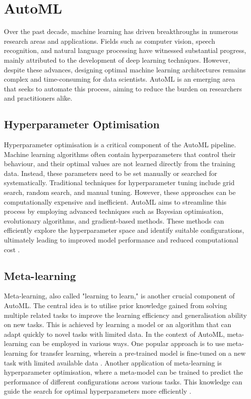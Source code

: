 \section{AutoML}\label{section:automl}

Over the past decade, machine learning has driven breakthroughs in numerous research areas and applications. Fields such as computer vision, speech recognition, and natural language processing have witnessed substantial progress, mainly attributed to the development of deep learning techniques. However, despite these advances, designing optimal machine learning architectures remains complex and time-consuming for data scientists. \Gls{AutoML} is an emerging area that seeks to automate this process, aiming to reduce the burden on researchers and practitioners alike. 

\subsection{Hyperparameter Optimisation}\label{subsection:hyperparameter-optimization}
Hyperparameter optimisation is a critical component of the \gls{AutoML} pipeline. Machine learning algorithms often contain hyperparameters that control their behaviour, and their optimal values are not learned directly from the training data. Instead, these parameters need to be set manually or searched for systematically. Traditional techniques for hyperparameter tuning include grid search, random search, and manual tuning. However, these approaches can be computationally expensive and inefficient.
\gls{AutoML} aims to streamline this process by employing advanced techniques such as Bayesian optimisation, evolutionary algorithms, and gradient-based methods. These methods can efficiently explore the hyperparameter space and identify suitable configurations, ultimately leading to improved model performance and reduced computational cost \autocite{bergstra2011algorithms, snoek2012practical}.

\subsection{Meta-learning}\label{subsection:meta-learning}
Meta-learning, also called "learning to learn," is another crucial component of \gls{AutoML}. The central idea is to utilise prior knowledge gained from solving multiple related tasks to improve the learning efficiency and generalisation ability on new tasks. This is achieved by learning a model or an algorithm that can adapt quickly to novel tasks with limited data.
In the context of \gls{AutoML}, meta-learning can be employed in various ways. One popular approach is to use meta-learning for transfer learning, wherein a pre-trained model is fine-tuned on a new task with limited available data \autocite{pan2010survey}. Another application of meta-learning is hyperparameter optimisation, where a meta-model can be trained to predict the performance of different configurations across various tasks. This knowledge can guide the search for optimal hyperparameters more efficiently \autocite{swersky2014freeze}.